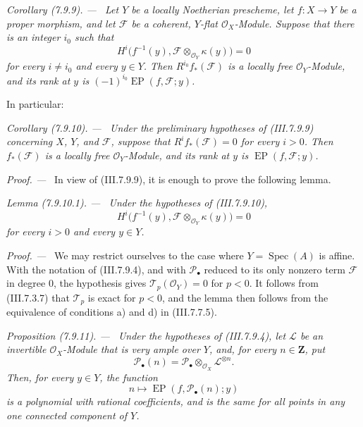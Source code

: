 \documentclass[10pt,oneside]{book}
\newcommand{\sh}[1]{\mathscr{#1}}
\newcommand{\bb}[1]{\mathbf{#1}}
\newcommand{\kres}{\kappa}
\newcommand{\Spec}{\operatorname{Spec}}
\newcommand{\sref}[2][]{(#2)}
\newcommand{\oldpage}[2][]{\setcounter{footnote}{0}\marginpar{\scriptsize\textbf{#1}~|~#2}\ignorespaces}
\newenvironment{proposition}[1][]{\par\medskip\noindent\itshape Proposition (#1). ---\ }{\par}
\newenvironment{lemma}[1][]{\par\medskip\noindent\itshape Lemma (#1). ---\ }{\par}
\newenvironment{corollary}[1][]{\par\medskip\noindent\itshape Corollary (#1). ---\ }{\par}
\newenvironment{proof}{\par\medskip\noindent\textit{Proof. ---\ }}{\par}
\begin{document}
\begin{corollary}[7.9.9]
\label{III.7.9.9}
Let $Y$ be a locally Noetherian prescheme, let
$f:X\to Y$ be a proper morphism, and let $\sh{F}$ be a
coherent, $Y$-flat $\sh{O}_X$-Module.  Suppose that there
is an integer $i_0$ such that
\[
  H^i\bigl(f^{-1}(y),
    \sh{F}\otimes_{\sh{O}_Y}\kres(y)\bigr)=0
\]
for every $i\neq i_0$ and every $y\in Y$.  Then
$R^{i_0}f_*(\sh{F})$ is a locally free
$\sh{O}_Y$-Module, and its rank at $y$ is
$(-1)^{i_0}\operatorname{EP}(f,\sh{F};y)$.
\end{corollary}

In particular:

\begin{corollary}[7.9.10]
\label{III.7.9.10}
Under the preliminary hypotheses of \sref{III.7.9.9}
concerning $X$, $Y$, and $\sh{F}$, suppose that
$R^if_*(\sh{F})=0$ for every $i>0$.  Then
$f_*(\sh{F})$ is a locally free $\sh{O}_Y$-Module, and its
rank at $y$ is $\operatorname{EP}(f,\sh{F};y)$.
\end{corollary}

\begin{proof}
In view of \sref{III.7.9.9}, it is enough to prove the
following lemma.
\end{proof}

\begin{lemma}[7.9.10.1]
\label{III.7.9.10.1}
Under the hypotheses of \sref{III.7.9.10},
\[
  H^i\bigl(f^{-1}(y),
    \sh{F}\otimes_{\sh{O}_Y}\kres(y)\bigr)=0
\]
for every $i>0$ and every $y\in Y$.
\end{lemma}

\begin{proof}
We may restrict ourselves to the case where
$Y=\Spec(A)$ is affine.  With the notation of
\sref{III.7.9.4}, and with $\sh{P}_\bullet$ reduced to its
only nonzero term $\sh{F}$ in degree $0$, the hypothesis
gives $\sh{T}_p(\sh{O}_Y)=0$ for $p<0$.  It follows from
\sref{III.7.3.7} that $\sh{T}_p$ is exact for $p<0$, and
the lemma then follows from the equivalence of conditions
a) and d) in \sref{III.7.7.5}.
\end{proof}

\oldpage[III]{211}
\begin{proposition}[7.9.11]
\label{III.7.9.11}
Under the hypotheses of \sref{III.7.9.4}, let $\sh{L}$ be
an invertible $\sh{O}_X$-Module that is very ample over
$Y$, and, for every $n\in\bb{Z}$, put
\[
  \sh{P}_\bullet(n)
  =
  \sh{P}_\bullet
    \otimes_{\sh{O}_X}\sh{L}^{\otimes n}.
\]
Then, for every $y\in Y$, the function
\[
  n\longmapsto
  \operatorname{EP}(f,\sh{P}_\bullet(n);y)
  \tag{7.9.11.1}\label{III.7.9.11.1}
\]
is a polynomial with rational coefficients, and is the
same for all points in any one connected component of
$Y$.
\end{proposition}
\end{document}
